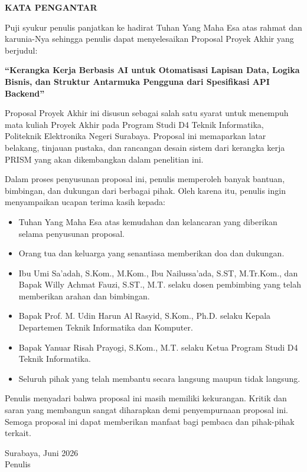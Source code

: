 \begin{center}
    {\fontsize{12pt}{14pt}\selectfont\textbf{KATA PENGANTAR}\par}
    \vspace{0.5cm}
\end{center}

Puji syukur penulis panjatkan ke hadirat Tuhan Yang Maha Esa atas rahmat dan karunia-Nya sehingga penulis dapat menyelesaikan Proposal Proyek Akhir yang berjudul:

\begin{center}
    \textbf{``Kerangka Kerja Berbasis AI untuk Otomatisasi Lapisan Data, Logika Bisnis, dan Struktur Antarmuka Pengguna dari Spesifikasi API Backend''}
\end{center}

Proposal Proyek Akhir ini disusun sebagai salah satu syarat untuk menempuh mata kuliah Proyek Akhir pada Program Studi D4 Teknik Informatika, Politeknik Elektronika Negeri Surabaya. Proposal ini memaparkan latar belakang, tinjauan pustaka, dan rancangan desain sistem dari kerangka kerja PRISM yang akan dikembangkan dalam penelitian ini.

Dalam proses penyusunan proposal ini, penulis memperoleh banyak bantuan, bimbingan, dan dukungan dari berbagai pihak. Oleh karena itu, penulis ingin menyampaikan ucapan terima kasih kepada:

\begin{itemize}
    \item Tuhan Yang Maha Esa atas kemudahan dan kelancaran yang diberikan selama penyusunan proposal.
    \item Orang tua dan keluarga yang senantiasa memberikan doa dan dukungan.
    \item Ibu Umi Sa'adah, S.Kom., M.Kom., Ibu Nailussa'ada, S.ST, M.Tr.Kom., dan Bapak Willy Achmat Fauzi, S.ST., M.T. selaku dosen pembimbing yang telah memberikan arahan dan bimbingan.
    \item Bapak Prof. M. Udin Harun Al Rasyid, S.Kom., Ph.D. selaku Kepala Departemen Teknik Informatika dan Komputer.
    \item Bapak Yanuar Risah Prayogi, S.Kom., M.T. selaku Ketua Program Studi D4 Teknik Informatika.
    \item Seluruh pihak yang telah membantu secara langsung maupun tidak langsung.
\end{itemize}

Penulis menyadari bahwa proposal ini masih memiliki kekurangan. Kritik dan saran yang membangun sangat diharapkan demi penyempurnaan proposal ini. Semoga proposal ini dapat memberikan manfaat bagi pembaca dan pihak-pihak terkait.

\vspace{1cm}

\begin{flushright}
Surabaya, Juni 2026\\[2cm]
Penulis
\end{flushright}
\newpage
